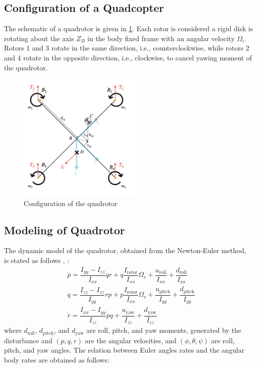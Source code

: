 \documentclass[conference]{IEEEtran}
\begin{document}
\subsection{Configuration of a Quadcopter}
The schematic of a quadrotor is given in \figurename{\ref{QuadAssum}}. Each rotor is considered a rigid disk is rotating about the axis $Z_B$ in the body fixed frame with an angular velocity $\Omega_i$.
Rotors 1 and 3 rotate in the same direction, i.e., counterclockwise, while rotors 2 and 4 rotate in the opposite direction, i.e., clockwise, to cancel yawing moment of the quadrotor.
\begin{figure}[!h]
	\includegraphics[width=6cm]{../Figures/Forces/StandAssumations.png}
	\centering
	\caption{Configuration of the quadrotor}
	\label{QuadAssum}
\end{figure}
\subsection{Modeling of Quadrotor}
The dynamic model of the quadrotor, obtained from the Newton-Euler method, is stated as follows \cite{b15}, \cite{b16}:
\begin{equation}
	\begin{split}
		&\dot p = \dfrac{I_{yy} - I_{zz}}{I_{xx}} qr + q \dfrac{I_{\text{rotor}}}{I_{xx}}\Omega_r + \dfrac{u_{\text{roll}}}{I_{xx}} + \dfrac{d_{\text{roll}}}{I_{xx}} \\
		&\dot q = \dfrac{I_{zz} - I_{zz}}{I_{yy}} rp + p \dfrac{I_{\text{rotor}}}{I_{xx}}\Omega_r + \dfrac{u_{\text{pitch}}}{I_{yy}} + \dfrac{d_{\text{pitch}}}{I_{yy}} \\
		&\dot r = \dfrac{I_{xx} - I_{yy}}{I_{zz}} pq  +  \dfrac{u_{\text{yaw}}}{I_{zz}} + \dfrac{d_{\text{yaw}}}{I_{zz}}
	\end{split}
\end{equation}
where $d_{\text{roll}}$, $d_{\text{pitch}}$, and $d_{\text{yaw}}$ are roll, pitch, and yaw moments, generated by the disturbance and  $(p, q, r)$ are the angular velocities, and $(\phi, \theta, \psi)$ are roll, pitch, and yaw angles. The relation between Euler angles rates and the angular body rates are obtained as follows:
\end{document}
